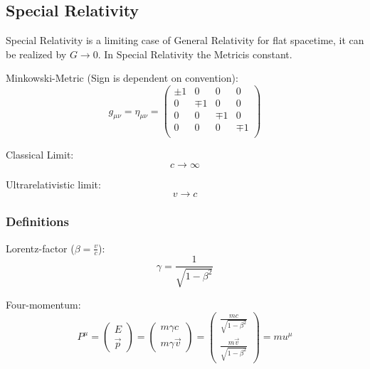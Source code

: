 	\subsection{Special Relativity}
		\noindent
		Special Relativity is a limiting case of General Relativity for flat spacetime, it can be realized by $G \rightarrow 0$. In Special Relativity the Metricis constant.

		\noindent
		Minkowski-Metric (Sign is dependent on convention):
		\begin{equation}
			g_{\mu\nu} = \eta_{\mu\nu}
			= \left( \begin{matrix}
				\pm1 & 0		& 0		& 0		\\
				0		& \mp1 & 0		& 0		\\
				0		& 0		& \mp1 & 0		\\
				0		& 0		& 0		& \mp1 \\
			\end{matrix} \right)
		\end{equation}

		\noindent
		Classical Limit:
		\begin{equation}
			c \rightarrow \infty
		\end{equation}

		\noindent
		Ultrarelativistic limit:
		\begin{equation}
			v\rightarrow c
		\end{equation}

		\subsubsection{Definitions}
			\noindent
			Lorentz-factor ($\beta = \frac{v}{c}$):
			\begin{equation}
				\gamma = \frac{1}{\sqrt{1-\beta^2}}
			\end{equation}

			\noindent
			Four-momentum:
			\begin{equation}
				P^\mu =
				\left(\begin{matrix}
					E \\ \vec{p}
				\end{matrix}\right)
				= \left(\begin{matrix}
					m\gamma c \\ m\gamma\vec{v}
				\end{matrix}\right)
				= \left(\begin{matrix}
					\frac{mc}{\sqrt{1-\beta^2}} \\ \frac{m\vec{v}}{\sqrt{1-\beta^2}}
				\end{matrix}\right)
				= m u^\mu
			\end{equation}

